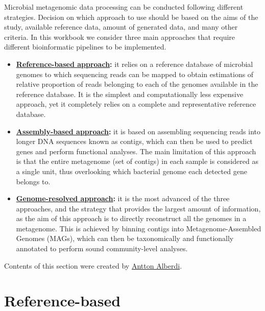 \documentclass[
]{book}
\providecommand{\tightlist}{%
  \setlength{\itemsep}{0pt}\setlength{\parskip}{0pt}}
\begin{document}
Microbial metagenomic data processing can be conducted following different strategies. Decision on which approach to use should be based on the aims of the study, available reference data, amount of generated data, and many other criteria. In this workbook we consider three main approaches that require different bioinformatic pipelines to be implemented.

\begin{itemize}
\tightlist
\item
  \textbf{\protect\hyperlink{reference-based}{Reference-based approach}:} it relies on a reference database of microbial genomes to which sequencing reads can be mapped to obtain estimations of relative proportion of reads belonging to each of the genomes available in the reference database. It is the simplest and computationally less expensive approach, yet it completely relies on a complete and representative reference database.
\item
  \textbf{\protect\hyperlink{assembly-based}{Assembly-based approach}:} it is based on assembling sequencing reads into longer DNA sequences known as contigs, which can then be used to predict genes and perform functional analyses. The main limitation of this approach is that the entire metagenome (set of contigs) in each sample is considered as a single unit, thus overlooking which bacterial genome each detected gene belongs to.
\item
  \textbf{\protect\hyperlink{genome-resolved}{Genome-resolved approach}:} it is the most advanced of the three approaches, and the strategy that provides the largest amount of information, as the aim of this approach is to directly reconstruct all the genomes in a metagenome. This is achieved by binning contigs into Metagenome-Assembled Genomes (MAGs), which can then be taxonomically and functionally annotated to perform sound community-level analyses.
\end{itemize}

Contents of this section were created by \protect\hyperlink{antton-alberdi}{Antton Alberdi}.

\hypertarget{reference-based}{%
\section{Reference-based}\label{reference-based}}
\end{document}
